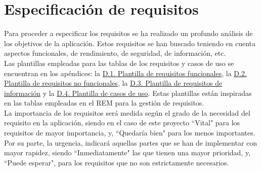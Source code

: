 \chapter{Especificación de requisitos}
\label{enlaceespecificacion}

Para proceder a especificar los requisitos se ha realizado un profundo análisis de los objetivos de la aplicación. Estos requisitos se han buscado teniendo en cuenta aspectos funcionales, de rendimiento, de seguridad, de información, etc.
\\

Las plantillas empleadas para las tablas de los requisitos y casos de uso se encuentran en los apéndices: la \hyperref[enlaceFRQX]{D.1. Plantilla de requisitos funcionales}, la \hyperref[enlaceNFRX]{D.2. Plantilla de requisitos no funcionales}, la \hyperref[enlaceIRQX]{D.3. Plantilla de requisitos de información} y la \hyperref[enlaceUCX]{D.4. Plantilla de casos de uso}.
Estas plantillas están inspiradas en las tablas empleadas en el REM \cite{rem} para la gestión de requisitos.
\\

La importancia de los requisitos será medida según el grado de la necesidad del requisito en la aplicación, siendo en el caso de este proyecto ``Vital" para los requisitos de mayor importancia, y, ``Quedaría bien" para los menos importantes. Por su parte, la urgencia, indicará aquellas partes que se han de implementar con mayor rapidez, siendo ``Inmediatamente" las que tienen una mayor prioridad, y, ``Puede esperar", para los requisitos que no son estrictamente necesarios.




